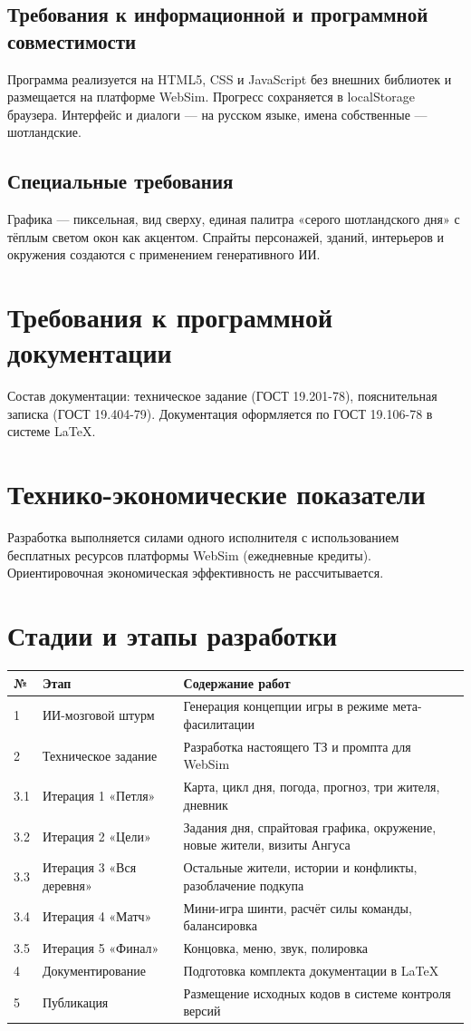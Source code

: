 \documentclass[12pt]{article}
\begin{document}
\subsection{Требования к информационной и программной совместимости}
Программа реализуется на HTML5, CSS и JavaScript без внешних библиотек и размещается на платформе WebSim. Прогресс сохраняется в localStorage браузера. Интерфейс и диалоги — на русском языке, имена собственные — шотландские.
\subsection{Специальные требования}
Графика — пиксельная, вид сверху, единая палитра «серого шотландского дня» с тёплым светом окон как акцентом. Спрайты персонажей, зданий, интерьеров и окружения создаются с применением генеративного ИИ.

\section{Требования к программной документации}
Состав документации: техническое задание (ГОСТ 19.201-78), пояснительная записка (ГОСТ 19.404-79). Документация оформляется по ГОСТ 19.106-78 в системе LaTeX.

\section{Технико-экономические показатели}
Разработка выполняется силами одного исполнителя с использованием бесплатных ресурсов платформы WebSim (ежедневные кредиты). Ориентировочная экономическая эффективность не рассчитывается.

\section{Стадии и этапы разработки}
\begin{longtable}{|p{10mm}|p{45mm}|p{95mm}|}\hline
№ & Этап & Содержание работ\\\hline\endhead
1 & ИИ-мозговой штурм & Генерация концепции игры в режиме мета-фасилитации\\\hline
2 & Техническое задание & Разработка настоящего ТЗ и промпта для WebSim\\\hline
3.1 & Итерация 1 «Петля» & Карта, цикл дня, погода, прогноз, три жителя, дневник\\\hline
3.2 & Итерация 2 «Цели» & Задания дня, спрайтовая графика, окружение, новые жители, визиты Ангуса\\\hline
3.3 & Итерация 3 «Вся деревня» & Остальные жители, истории и конфликты, разоблачение подкупа\\\hline
3.4 & Итерация 4 «Матч» & Мини-игра шинти, расчёт силы команды, балансировка\\\hline
3.5 & Итерация 5 «Финал» & Концовка, меню, звук, полировка\\\hline
4 & Документирование & Подготовка комплекта документации в LaTeX\\\hline
5 & Публикация & Размещение исходных кодов в системе контроля версий\\\hline
\end{longtable}
\end{document}
